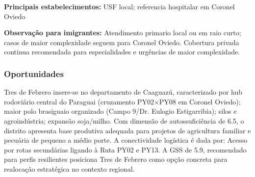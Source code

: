 \textbf{Principais estabelecimentos:} USF local; referencia hospitalar
em Coronel Oviedo

\textbf{Observação para imigrantes:} Atendimento primario local ou em
raio curto; casos de maior complexidade seguem para Coronel Oviedo.
Cobertura privada continua recomendada para especialidades e urgências
de maior complexidade.
\newpage

\subsubsection*{Oportunidades}\label{oport-tres-de-febrero-0518}
Tres de Febrero insere-se no departamento de Caaguazú, caracterizado por hub rodoviário central do Paraguai (cruzamento PY02×PY08 em Coronel Oviedo); maior polo brasiguaio organizado (Campo 9/Dr. Eulogio Estigarribia); silos e agroindústria; expansão soja/milho. Com dimensão de autossuficiência de 6.5, o distrito apresenta base produtiva adequada para projetos de agricultura familiar e pecuária de pequeno a médio porte. A conectividade logística é dada por: Acesso por rotas secundárias ligando à Ruta PY02 e PY13. A GSS de 5.9, recomendado para perfis resilientes posiciona Tres de Febrero como opção concreta para realocação estratégica no contexto regional.

